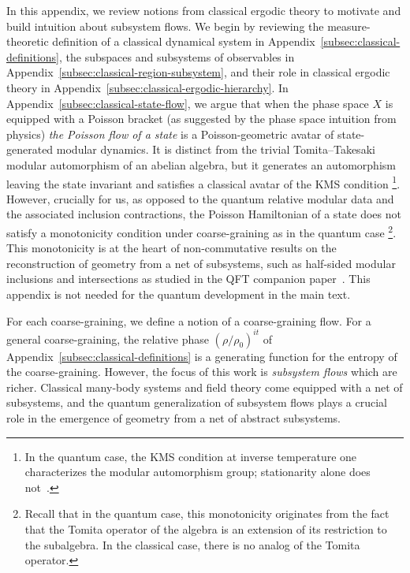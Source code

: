 \documentclass[a4paper,11pt]{article}
\theoremstyle{definition}
\begin{document}
In this appendix, we review notions from classical ergodic theory to motivate and build intuition about subsystem flows.
We begin by reviewing the measure-theoretic definition of a classical dynamical system in Appendix~\ref{subsec:classical-definitions}, the subspaces and subsystems of observables in Appendix~\ref{subsec:classical-region-subsystem}, and their role in classical ergodic theory in Appendix~\ref{subsec:classical-ergodic-hierarchy}. In Appendix~\ref{subsec:classical-state-flow}, we argue that when the phase space $X$ is equipped with a Poisson bracket (as suggested by the phase space intuition from physics) {\it the Poisson flow of a state} is a Poisson-geometric avatar of state-generated modular dynamics. It is distinct from the trivial Tomita--Takesaki modular automorphism of an abelian algebra, but it generates an automorphism leaving the state invariant and satisfies a classical avatar of the KMS condition \footnote{In the quantum case, the KMS condition at inverse temperature one characterizes the modular automorphism group; stationarity alone does not~\cite{Takesaki1970}.}. However, crucially for us, as opposed to the quantum relative modular data and the associated inclusion contractions, the Poisson Hamiltonian of a state does not satisfy a monotonicity condition under coarse-graining as in the quantum case \footnote{Recall that in the quantum case, this monotonicity originates from the fact that the Tomita operator of the algebra is an extension of its restriction to the subalgebra. In the classical case, there is no analog of the Tomita operator.}. This monotonicity is at the heart of non-commutative results on the reconstruction of geometry from a net of subsystems, such as half-sided modular inclusions and intersections as studied in the QFT companion paper~\cite{companionQFT}. This appendix is not needed for the quantum development in the main text.

For each coarse-graining, we define a notion of a coarse-graining flow. For a general coarse-graining, the relative phase $(\rho/\rho_0)^{it}$ of Appendix~\ref{subsec:classical-definitions} is a generating function for the entropy of the coarse-graining. However, the focus of this work is {\it subsystem flows} which are richer.
Classical many-body systems and field theory come equipped with a net of subsystems, and the quantum generalization of subsystem flows plays a crucial role in the emergence of geometry from a net of abstract subsystems.
\end{document}
